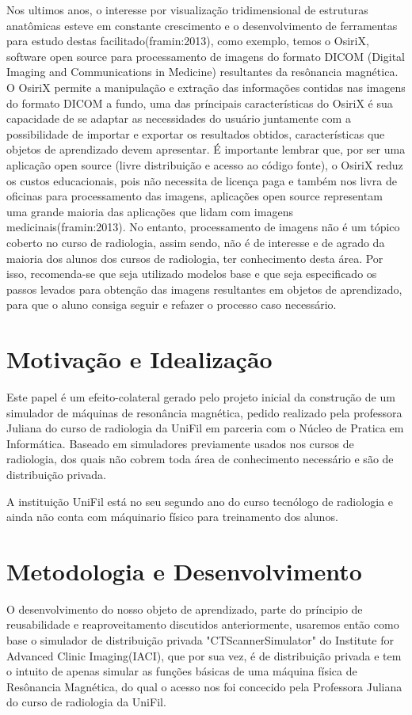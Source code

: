 \documentclass[12pt,openright,oneside,a4paper,english,french,spanish,brazil]{unifil}
\begin{document}
Nos ultimos anos, o interesse por visualização tridimensional de estruturas anatômicas esteve em constante crescimento e o desenvolvimento de ferramentas para estudo destas facilitado(framin:2013), como exemplo, temos o OsiriX, software open source para processamento de imagens do formato DICOM (Digital Imaging and Communications in Medicine) resultantes da resônancia magnética. O OsiriX permite a manipulação e extração das informações contidas nas imagens do formato DICOM a fundo, uma das príncipais características do OsiriX é sua capacidade de se adaptar as necessidades do usuário juntamente com a possibilidade de importar e exportar os resultados obtidos, características que objetos de aprendizado devem apresentar. É importante lembrar que, por ser uma aplicação open source (livre distribuição e acesso ao código fonte), o OsiriX reduz os custos educacionais, pois não necessita de licença paga e também nos livra de oficinas para processamento das imagens, aplicações open source representam uma grande maioria das aplicações que lidam com imagens medicinais(framin:2013). No entanto, processamento de imagens não é um tópico coberto no curso de radiologia, assim sendo, não é de interesse e de agrado da maioria dos alunos dos cursos de radiologia, ter conhecimento desta área. Por isso, recomenda-se que seja utilizado modelos base e que seja especificado os passos levados para obtenção das imagens resultantes em objetos de aprendizado, para que o aluno consiga seguir e refazer o processo caso necessário.

\chapter{Motivação e Idealização}%

Este papel é um efeito-colateral gerado pelo projeto inicial da construção de um simulador de máquinas de resonância magnética, pedido realizado pela professora Juliana do curso de radiologia da UniFil em parceria com o Núcleo de Pratica em Informática. Baseado em simuladores previamente usados nos cursos de radiologia, dos quais não cobrem toda área de conhecimento necessário e são de distribuição privada.

A instituição UniFil está no seu segundo ano do curso tecnólogo de radiologia e ainda não conta com máquinario físico para treinamento dos alunos.

\chapter {Metodologia e Desenvolvimento}
O desenvolvimento do nosso objeto de aprendizado, parte do príncipio de reusabilidade e reaproveitamento discutidos anteriormente, usaremos então como base o simulador de distribuição privada "CTScannerSimulator" do Institute for Advanced Clinic Imaging(IACI), que por sua vez, é de distribuição privada e tem o intuito de apenas simular as funções básicas de uma máquina física de Resônancia Magnética, do qual o acesso nos foi concecido pela Professora Juliana do curso de radiologia da UniFil.
\end{document}

